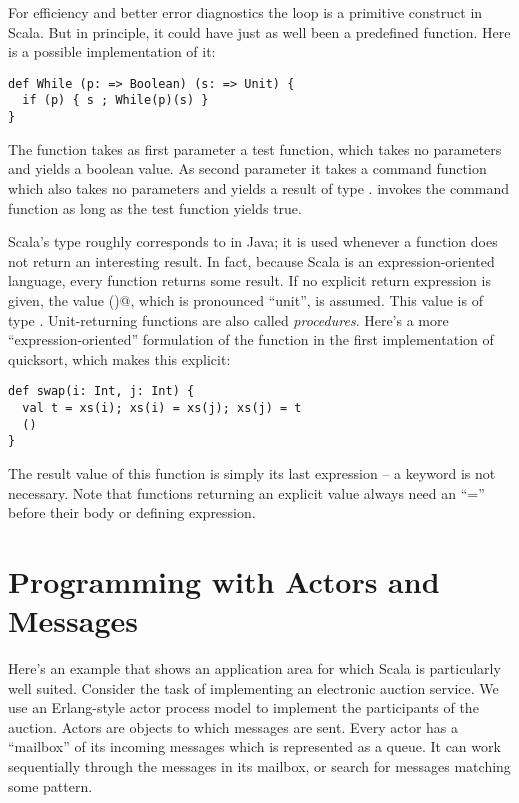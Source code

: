 For efficiency and better error diagnostics the  loop is a
primitive construct in Scala. But in principle, it could have just as
well been a predefined function. Here is a possible implementation of it:
\begin{lstlisting}
def While (p: => Boolean) (s: => Unit) {
  if (p) { s ; While(p)(s) }
}
\end{lstlisting}
The  function takes as first parameter a test function,
which takes no parameters and yields a boolean value. As second
parameter it takes a command function which also takes no parameters
and yields a result of type \lstinline@Unit@.  invokes the
command function as long as the test function yields true.

Scala's \lstinline@Unit@ type roughly corresponds to \lstinline@void@
in Java; it is used whenever a function does not return an interesting
result. In fact, because Scala is an expression-oriented language,
every function returns some result. If no explicit return expression
is given, the value \lstinline@()@, which is pronounced ``unit'', is
assumed.  This value is of type \lstinline@Unit@.
Unit-returning functions are also called {\em procedures}.  
Here's a more
``expression-oriented'' formulation of the \lstinline@swap@ function
in the first implementation of quicksort, which makes this explicit:
\begin{lstlisting}
def swap(i: Int, j: Int) {
  val t = xs(i); xs(i) = xs(j); xs(j) = t
  ()
}
\end{lstlisting}
The result value of this function is simply its last expression -- a
\lstinline@return@ keyword is not necessary. Note that functions
returning an explicit value always need an ``='' before their
body or defining expression.  

\chapter{Programming with Actors and Messages}
\label{chap:example-auction}

Here's an example that shows an application area for which Scala is
particularly well suited. Consider the task of implementing an
electronic auction service. We use an Erlang-style actor process
model to implement the participants of the auction. Actors are
objects to which messages are sent. Every actor has a ``mailbox'' of
its incoming messages which is represented as a queue. It can work
sequentially through the messages in its mailbox, or search for
messages matching some pattern.


